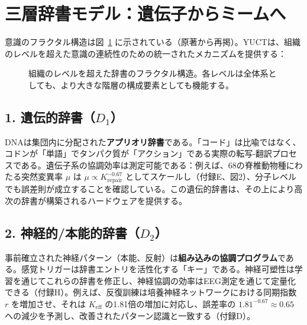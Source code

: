 \documentclass[12pt,a4paper]{article}
\newcommand{\eff}{\mathrm{eff}}
\newcommand{\Ke}{K_{\eff}}
\begin{document}
	\section{三層辞書モデル：遺伝子からミームへ}
	
	意識のフラクタル構造は図~\ref{fig:fractal_dict} に示されている（原著から再掲）。YUCTは、組織のレベルを超えた意識の連続性のための統一されたメカニズムを提供する：
	
	\begin{figure}[htbp]
		\centering
		\caption{組織のレベルを超えた辞書のフラクタル構造。各レベルは全体系としても、より大きな階層の構成要素としても機能する。}
		\label{fig:fractal_dict}
	\end{figure}
	
	\subsection{1. 遺伝的辞書（\(D_1\)）}
	
	DNAは集団内に分配された\textbf{アプリオリ辞書}である。「コード」は比喩ではなく、コドンが「単語」でタンパク質が「アクション」である実際の転写-翻訳プロセスである。遺伝子系の協調効率は測定可能である：例えば、68の脊椎動物種にわたる突然変異率 \(\mu\) は \(\mu \propto K_{\text{repair}}^{-0.67}\) としてスケールし（付録E、図2）、分子レベルでも誤差則が成立することを確認している。この遺伝的辞書は、その上により高次の辞書が構築されるハードウェアを提供する。
	
	\subsection{2. 神経的/本能的辞書（\(D_2\)）}
	
	事前確立された神経パターン（本能、反射）は\textbf{組み込みの協調プログラム}である。感覚トリガーは辞書エントリを活性化する「キー」である。神経可塑性は学習を通じてこれらの辞書を修正し、神経協調の効率はEEG測定を通じて定量化できる（付録H）。例えば、反復訓練は培養神経ネットワークにおける同期指数 \(r\) を増加させ、それは \(\Ke\) の1.81倍の増加に対応し、誤差率の \(1.81^{-0.67} \approx 0.65\) への減少を予測し、改善されたパターン認識と一致する（付録D）。
	
\end{document}
